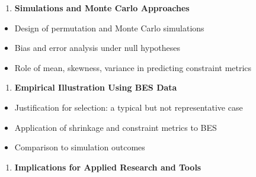 \documentclass[
  12pt,
]{article}
\providecommand{\tightlist}{%
  \setlength{\itemsep}{0pt}\setlength{\parskip}{0pt}}\usepackage{longtable,booktabs,array}
\theoremstyle{plain}
\theoremstyle{definition}
\theoremstyle{remark}
\begin{document}
\begin{enumerate}
\def\labelenumi{\arabic{enumi}.}
\setcounter{enumi}{3}
\tightlist
\item
  \textbf{Simulations and Monte Carlo Approaches}
\end{enumerate}

\begin{itemize}
\tightlist
\item
  Design of permutation and Monte Carlo simulations
\item
  Bias and error analysis under null hypotheses
\item
  Role of mean, skewness, variance in predicting constraint metrics
\end{itemize}

\begin{enumerate}
\def\labelenumi{\arabic{enumi}.}
\setcounter{enumi}{4}
\tightlist
\item
  \textbf{Empirical Illustration Using BES Data}
\end{enumerate}

\begin{itemize}
\tightlist
\item
  Justification for selection: a typical but not representative case
\item
  Application of shrinkage and constraint metrics to BES
\item
  Comparison to simulation outcomes
\end{itemize}

\begin{enumerate}
\def\labelenumi{\arabic{enumi}.}
\setcounter{enumi}{5}
\tightlist
\item
  \textbf{Implications for Applied Research and Tools}
\end{enumerate}
\end{document}
